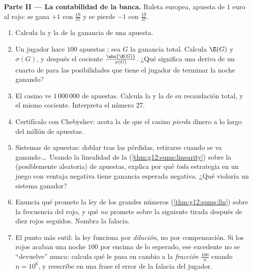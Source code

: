 \begin{problem}
\medskip
\noindent\textbf{Parte II --- La contabilidad de la banca.}
Ruleta europea, apuesta de $1$ euro al rojo: se gana $+1$ con 
$\frac{18}{37}$ y se pierde $-1$ con  $\frac{19}{37}$.
\begin{enumerate}[resume]
  \item Calcula la  y la  de la ganancia de una
        apuesta.
  \item Un jugador hace $100$ apuestas ; sea $G$ la ganancia
        total. Calcula $\E(G)$ y $\sigma(G)$, y después el cociente
        $\frac{\abs{\E(G)}}{\sigma(G)}$. ¿Qué significa una deriva de un
        cuarto de  para las posibilidades que tiene el
        jugador de terminar la noche ganando?
  \item El casino ve $1\,000\,000$ de apuestas. Calcula la  y la
         de su recaudación total, y el mismo cociente.
        Interpreta el número $27$.
  \item Certifícalo con Chebyshev: acota la  de que el casino
        \emph{pierda} dinero a lo largo del millón de apuestas.
  \item Sistemas de apuestas: doblar tras las pérdidas, retirarse cuando se
        va ganando\,\dots\ Usando la linealidad de la 
        (\cref{thm:g12:sums:linearity}) sobre la  (posiblemente
        aleatoria) de apuestas, explica por qué \emph{toda} estrategia en
        un juego con ventaja negativa tiene ganancia esperada negativa.
        ¿Qué violaría un sistema ganador?
  \item Enuncia qué promete la ley de los grandes números
        (\cref{thm:g12:sums:lln}) sobre la frecuencia del rojo, y qué
        \emph{no} promete sobre la siguiente tirada después de diez rojos
        seguidos. Nombra la falacia.
  \item El punto más sutil: la ley funciona por \emph{dilución}, no por
        compensación. Si los rojos acaban una noche $100$ por encima de lo
        esperado, ese excedente no se ``devuelve'' nunca: calcula qué le
        pasa en cambio a la \emph{fracción} $\frac{100}{n}$ cuando
        $n = 10^6$, y reescribe en una frase el error de la falacia del
        jugador.
\end{enumerate}


\end{problem}
